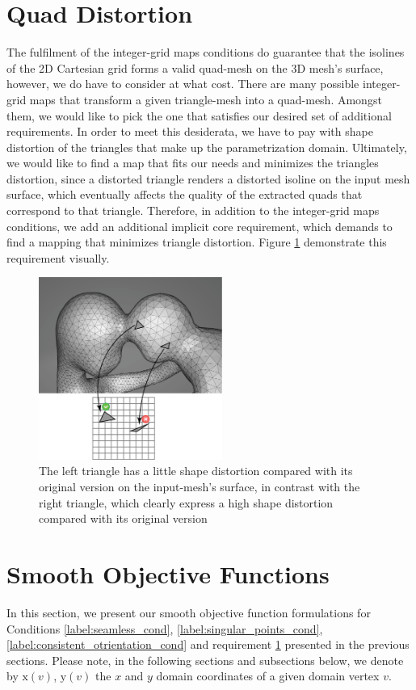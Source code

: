 \section{Quad Distortion}
\label{label:quad_distortion_cond}
The fulfilment of the integer-grid maps conditions do guarantee that the isolines of the 2D Cartesian grid forms a valid quad-mesh on the 3D mesh's surface, however, we do have to consider at what cost. There are many possible integer-grid maps that transform a given triangle-mesh into a quad-mesh. Amongst them, we would like to pick the one that satisfies our desired set of additional requirements. In order to meet this desiderata, we have to pay with shape distortion of the triangles that make up the parametrization domain. Ultimately, we would like to find a map that fits our needs and minimizes the triangles distortion, since a distorted triangle renders a distorted isoline on the input mesh surface, which eventually affects the quality of the extracted quads that correspond to that triangle. Therefore, in addition to the integer-grid maps conditions, we add an additional implicit core requirement, which demands to find a mapping that minimizes triangle distortion. Figure \ref{fig:distortion_req} demonstrate this requirement visually.
\begin{figure}[ht]
\centering
\includegraphics[width=6cm]{figures/distortion/distortion.png}
\caption[The Orientation Requirement]{The left triangle has a little shape distortion compared with its original version on the input-mesh's surface, in contrast with the right triangle, which clearly express a high shape distortion compared with its original version}
\label{fig:distortion_req}
\end{figure}
\section{Smooth Objective Functions}
In this section, we present our smooth objective function formulations for Conditions \ref{label:seamless_cond}, \ref{label:singular_points_cond}, \ref{label:consistent_otrientation_cond} and requirement \ref{label:quad_distortion_cond} presented in the previous sections. Please note, in the following sections and subsections below, we denote by $\mathrm{x}\left(v\right)$, $\mathrm{y}\left(v\right)$ the $x$ and $y$ domain coordinates of a given domain vertex $v$.
